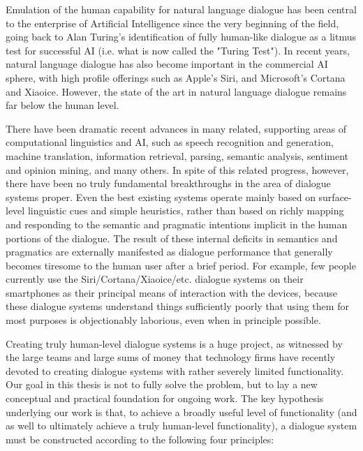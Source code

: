 \begin{englishabstract}

Emulation of the human capability for natural language dialogue has been central to the enterprise of Artificial Intelligence since the very beginning of the field, going back to Alan Turing's identification of fully human-like dialogue as a litmus test for successful AI (i.e. what is now called the "Turing Test").  In recent years, natural language dialogue has also become important in the commercial AI sphere, with high profile offerings such as Apple's Siri, and Microsoft's Cortana and Xiaoice.  However, the state of the art in natural language dialogue remains far below the human level.  

There have been dramatic recent advances in many related, supporting areas of computational linguistics and AI, such as speech recognition and generation, machine translation, information retrieval, parsing, semantic analysis, sentiment and opinion mining, and many others.  In spite of this related progress, however, there have been no truly fundamental breakthroughs in the area of dialogue systems proper.  Even the best existing systems operate mainly based on surface-level linguistic cues and simple heuristics, rather than based on richly mapping and responding to the semantic and pragmatic intentions implicit in the human portions of the dialogue.  The result of these internal deficits in semantics and pragmatics are externally manifested as dialogue performance that generally becomes tiresome to the human user after a brief period.  For example, few people currently use the Siri/Cortana/Xiaoice/etc. dialogue systems on their smartphones as their principal means of interaction with the devices, because these dialogue systems understand things sufficiently poorly that using them for most purposes is objectionably laborious, even when in principle possible.

Creating truly human-level dialogue systems is a huge project, as witnessed by the large teams and large sums of money that technology firms have recently devoted to creating dialogue systems with rather severely limited functionality.   Our goal in this thesis is not to fully solve the problem, but to lay a new conceptual and practical foundation for ongoing work.  The key hypothesis underlying our work is that, to achieve a broadly useful level of functionality (and as well to ultimately achieve a truly human-level functionality), a dialogue system must be constructed according to the following four principles:


\end{englishabstract}
